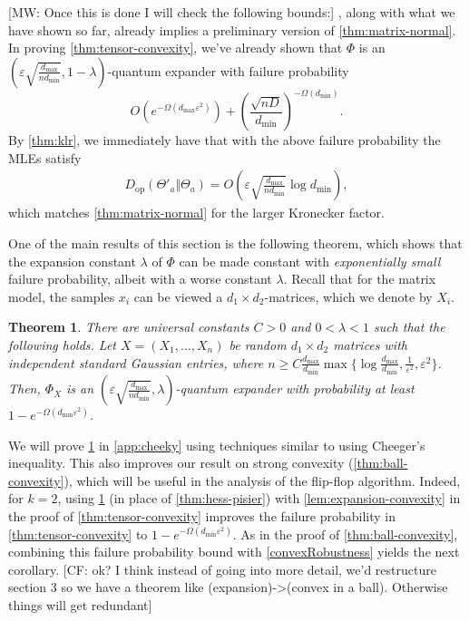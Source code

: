 \documentclass[aos]{imsart}
\newtheorem{theorem}{Theorem}[section]
\theoremstyle{definition}
\numberwithin{equation}{section}
\DeclareMathOperator{\op}{op}
\newcommand{\eps}{\varepsilon}
\def\dmax{d_{\max}}
\newcommand{\CF}[1]{{\color{purple}[CF: #1]}}
\newcommand{\MW}[1]{{\color{red}[MW: #1]}}
\begin{document}
\MW{Once this is done I will check the following bounds:}
{\color{red}, along with what we have shown so far, already implies a preliminary version of \cref{thm:matrix-normal}.
In proving \cref{thm:tensor-convexity}, we've already shown that $\Phi$ is an $(\eps \sqrt{\frac{\dmax}{n d_{\min}}}, 1 - \lambda)$-quantum expander with failure probability
\[ O(e^{ - \Omega( \dmax \eps^2)}) + \left( \frac{\sqrt{nD}}{d_{\min}} \right)^{ - \Omega(d_{\min})}. \]
By \cref{thm:klr}, we immediately have that with the above failure probability the MLEs satisfy
\begin{align*}
  D_{\op}(\Theta'_a \Vert \Theta_a) = O\left(\eps \sqrt{\frac{\dmax}{n d_{\min}}} \log d_{\min}\right),
\end{align*}
which matches \cref{thm:matrix-normal} for the larger Kronecker factor.}

One of the main results of this section is the following theorem, which shows that the expansion constant $\lambda$ of $\Phi$ can be made constant with \emph{exponentially small} failure probability, albeit with a worse constant $\lambda$.
Recall that for the matrix model, the samples $x_i$ can be viewed a $d_1 \times d_2$-matrices, which we denote by $X_i$.

\begin{theorem}\label{thm:operator-cheeger}
There are universal constants $C > 0$ and $0<\lambda<1$ such that the following holds.
Let $X=(X_1,\dots,X_n)$ be random $d_1 \times d_2$ matrices with independent standard Gaussian entries, where $n \geq C \frac{\dmax}{d_{\min}} \max\{\log \frac{\dmax}{d_{\min}}, \frac1{\eps^2}, \eps^2 \}$.
Then, $\Phi_X$ is an $(\eps \sqrt{\frac{\dmax}{n d_{\min}}}, \lambda)$-quantum expander with probability at least $1 - e^{ - \Omega( d_{\min} \eps^2)}$.
\end{theorem}

We will prove \cref{thm:operator-cheeger} in \cref{app:cheeky} using techniques similar to \cite{FM20} using Cheeger's inequality.
This also improves our result on strong convexity (\cref{thm:ball-convexity}), which will be useful in the analysis of the flip-flop algorithm. Indeed, for $k = 2$, using \cref{thm:operator-cheeger} (in place of \cref{thm:hess-pisier}) with \cref{lem:expansion-convexity} in the proof of \cref{thm:tensor-convexity} improves the failure probability in \cref{thm:tensor-convexity} to $1 - e^{ - \Omega( d_{\min} \eps^2)}$. As in the proof of \cref{thm:ball-convexity}, combining this failure probability bound with \cref{convexRobustness} yields the next corollary. \CF{ok? I think instead of going into more detail, we'd restructure section 3 so we have a theorem like (expansion)->(convex in a ball). Otherwise things will get redundant}
\end{document}
